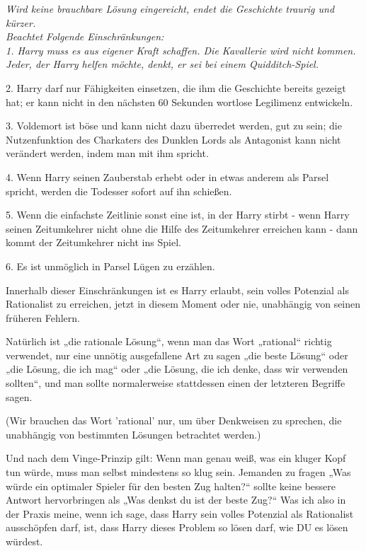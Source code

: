 {\emph{Wird keine brauchbare Lösung eingereicht, endet die Geschichte traurig und kürzer.}\\ \emph{\hfill\break Beachtet Folgende Einschränkungen:\\ 1. Harry muss es aus eigener Kraft schaffen. Die Kavallerie wird nicht kommen. Jeder, der Harry helfen möchte, denkt, er sei bei einem Quidditch-Spiel.}

2. Harry darf nur Fähigkeiten einsetzen, die ihm die Geschichte bereits gezeigt hat; er kann nicht in den nächsten 60 Sekunden wortlose Legilimenz entwickeln.

3. Voldemort ist böse und kann nicht dazu überredet werden, gut zu sein; die Nutzenfunktion des Charkaters des Dunklen Lords als Antagonist kann nicht verändert werden, indem man mit ihm spricht.

4. Wenn Harry seinen Zauberstab erhebt oder in etwas anderem als Parsel spricht, werden die Todesser sofort auf ihn schießen.

5. Wenn die einfachste Zeitlinie sonst eine ist, in der Harry stirbt - wenn Harry seinen Zeitumkehrer nicht ohne die Hilfe des Zeitumkehrer erreichen kann - dann kommt der Zeitumkehrer nicht ins Spiel.

6. Es ist unmöglich in Parsel Lügen zu erzählen.

Innerhalb dieser Einschränkungen ist es Harry erlaubt, sein volles Potenzial als Rationalist zu erreichen, jetzt in diesem Moment oder nie, unabhängig von seinen früheren Fehlern.

Natürlich ist „die rationale Lösung“, wenn man das Wort „rational“ richtig verwendet, nur eine unnötig ausgefallene Art zu sagen „die beste Lösung“ oder „die Lösung, die ich mag“ oder „die Lösung, die ich denke, dass wir verwenden sollten“, und man sollte normalerweise stattdessen einen der letzteren Begriffe sagen.

(Wir brauchen das Wort 'rational' nur, um über Denkweisen zu sprechen, die unabhängig von bestimmten Lösungen betrachtet werden.)

Und nach dem Vinge-Prinzip gilt: Wenn man genau weiß, was ein kluger Kopf tun würde, muss man selbst mindestens so klug sein. Jemanden zu fragen „Was würde ein optimaler Spieler für den besten Zug halten?“ sollte keine bessere Antwort hervorbringen als „Was denkst du ist der beste Zug?“ Was ich also in der Praxis meine, wenn ich sage, dass Harry sein volles Potenzial als Rationalist ausschöpfen darf, ist, dass Harry dieses Problem so lösen darf, wie DU es lösen würdest.

}
